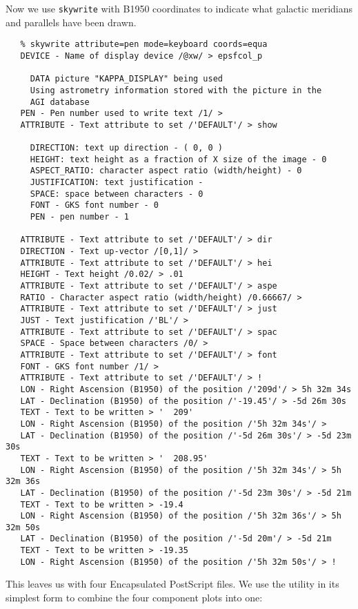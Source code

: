    Now we use {\tt skywrite} with B1950 coordinates to indicate what
   galactic meridians and parallels have been drawn.

\begin{verbatim}
   % skywrite attribute=pen mode=keyboard coords=equa
   DEVICE - Name of display device /@xw/ > epsfcol_p

     DATA picture "KAPPA_DISPLAY" being used
     Using astrometry information stored with the picture in the
     AGI database
   PEN - Pen number used to write text /1/ >
   ATTRIBUTE - Text attribute to set /'DEFAULT'/ > show

     DIRECTION: text up direction - ( 0, 0 )
     HEIGHT: text height as a fraction of X size of the image - 0
     ASPECT_RATIO: character aspect ratio (width/height) - 0
     JUSTIFICATION: text justification -
     SPACE: space between characters - 0
     FONT - GKS font number - 0
     PEN - pen number - 1

   ATTRIBUTE - Text attribute to set /'DEFAULT'/ > dir
   DIRECTION - Text up-vector /[0,1]/ >
   ATTRIBUTE - Text attribute to set /'DEFAULT'/ > hei
   HEIGHT - Text height /0.02/ > .01
   ATTRIBUTE - Text attribute to set /'DEFAULT'/ > aspe
   RATIO - Character aspect ratio (width/height) /0.66667/ >
   ATTRIBUTE - Text attribute to set /'DEFAULT'/ > just
   JUST - Text justification /'BL'/ >
   ATTRIBUTE - Text attribute to set /'DEFAULT'/ > spac
   SPACE - Space between characters /0/ >
   ATTRIBUTE - Text attribute to set /'DEFAULT'/ > font
   FONT - GKS font number /1/ >
   ATTRIBUTE - Text attribute to set /'DEFAULT'/ > !
   LON - Right Ascension (B1950) of the position /'209d'/ > 5h 32m 34s
   LAT - Declination (B1950) of the position /'-19.45'/ > -5d 26m 30s
   TEXT - Text to be written > '  209'
   LON - Right Ascension (B1950) of the position /'5h 32m 34s'/ >
   LAT - Declination (B1950) of the position /'-5d 26m 30s'/ > -5d 23m 30s
   TEXT - Text to be written > '  208.95'
   LON - Right Ascension (B1950) of the position /'5h 32m 34s'/ > 5h 32m 36s
   LAT - Declination (B1950) of the position /'-5d 23m 30s'/ > -5d 21m
   TEXT - Text to be written > -19.4
   LON - Right Ascension (B1950) of the position /'5h 32m 36s'/ > 5h 32m 50s
   LAT - Declination (B1950) of the position /'-5d 20m'/ > -5d 21m
   TEXT - Text to be written > -19.35
   LON - Right Ascension (B1950) of the position /'5h 32m 50s'/ > !
\end{verbatim}

   This leaves us with four Encapsulated PostScript files. We use the
{\tt {}}
   utility in its simplest form to combine the four
   component plots into one:

